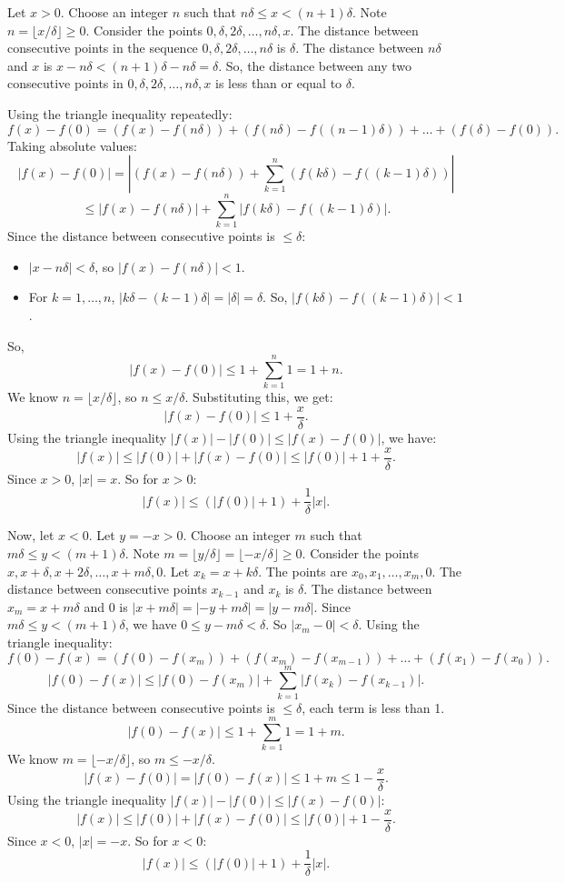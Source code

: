 \documentclass{article}
\begin{document}
Let \(x > 0\). Choose an integer \(n\) such that \(n\delta \le x < (n+1)\delta\). Note \(n = \lfloor x/\delta \rfloor \ge 0\).
Consider the points \(0, \delta, 2\delta, \ldots, n\delta, x\).
The distance between consecutive points in the sequence \(0, \delta, 2\delta, \ldots, n\delta\) is \(\delta\).
The distance between \(n\delta\) and \(x\) is \(x - n\delta < (n+1)\delta - n\delta = \delta\).
So, the distance between any two consecutive points in \(0, \delta, 2\delta, \dots, n\delta, x\) is less than or equal to \(\delta\).

Using the triangle inequality repeatedly:
\[ f(x) - f(0) = (f(x) - f(n\delta)) + (f(n\delta) - f((n-1)\delta)) + \dots + (f(\delta) - f(0)). \]
Taking absolute values:
\[ |f(x) - f(0)| = \left|(f(x) - f(n\delta)) + \sum_{k=1}^{n} (f(k\delta) - f((k-1)\delta))\right| \]
\[ \le |f(x) - f(n\delta)| + \sum_{k=1}^{n} |f(k\delta) - f((k-1)\delta)|. \]
Since the distance between consecutive points is \(\le \delta\):
\begin{itemize}
    \item \(|x - n\delta| < \delta\), so \(|f(x) - f(n\delta)| < 1\).
    \item For \(k=1, \ldots, n\), \(|k\delta - (k-1)\delta| = |\delta| = \delta\). So, \(|f(k\delta) - f((k-1)\delta)| < 1\).
\end{itemize}
So,
\[ |f(x) - f(0)| \le 1 + \sum_{k=1}^{n} 1 = 1 + n. \]
We know \(n = \lfloor x/\delta \rfloor\), so \(n \le x/\delta\).
Substituting this, we get:
\[ |f(x) - f(0)| \le 1 + \frac{x}{\delta}. \]
Using the triangle inequality \(|f(x)| - |f(0)| \le |f(x) - f(0)|\), we have:
\[ |f(x)| \le |f(0)| + |f(x) - f(0)| \le |f(0)| + 1 + \frac{x}{\delta}. \]
Since \(x > 0\), \(|x| = x\). So for \(x > 0\):
\[ |f(x)| \le (|f(0)| + 1) + \frac{1}{\delta} |x|. \]

Now, let \(x < 0\). Let \(y = -x > 0\). Choose an integer \(m\) such that \(m\delta \le y < (m+1)\delta\). Note \(m = \lfloor y/\delta \rfloor = \lfloor -x/\delta \rfloor \ge 0\).
Consider the points \(x, x+\delta, x+2\delta, \ldots, x+m\delta, 0\).
Let \(x_k = x + k\delta\). The points are \(x_0, x_1, \dots, x_m, 0\).
The distance between consecutive points \(x_{k-1}\) and \(x_k\) is \(\delta\).
The distance between \(x_m = x+m\delta\) and \(0\) is \(|x+m\delta| = |-y+m\delta| = |y-m\delta|\). Since \(m\delta \le y < (m+1)\delta\), we have \(0 \le y-m\delta < \delta\). So \(|x_m - 0| < \delta\).
Using the triangle inequality:
\[ f(0) - f(x) = (f(0) - f(x_m)) + (f(x_m) - f(x_{m-1})) + \dots + (f(x_1) - f(x_0)). \]
\[ |f(0) - f(x)| \le |f(0) - f(x_m)| + \sum_{k=1}^{m} |f(x_k) - f(x_{k-1})|. \]
Since the distance between consecutive points is \(\le \delta\), each term is less than 1.
\[ |f(0) - f(x)| \le 1 + \sum_{k=1}^{m} 1 = 1 + m. \]
We know \(m = \lfloor -x/\delta \rfloor\), so \(m \le -x/\delta\).
\[ |f(x) - f(0)| = |f(0) - f(x)| \le 1 + m \le 1 - \frac{x}{\delta}. \]
Using the triangle inequality \(|f(x)| - |f(0)| \le |f(x) - f(0)|\):
\[ |f(x)| \le |f(0)| + |f(x) - f(0)| \le |f(0)| + 1 - \frac{x}{\delta}. \]
Since \(x < 0\), \(|x| = -x\). So for \(x < 0\):
\[ |f(x)| \le (|f(0)| + 1) + \frac{1}{\delta} |x|. \]
\end{document}

